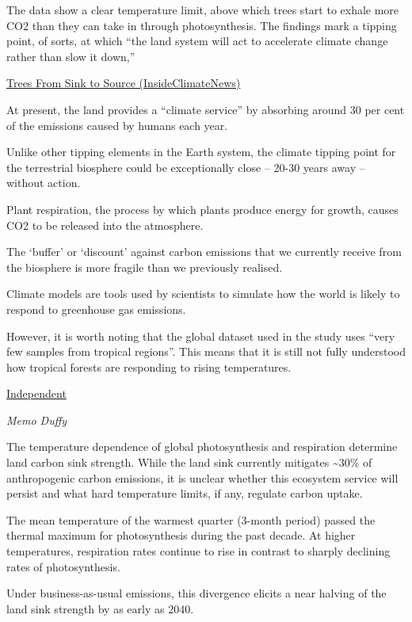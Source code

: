 \documentclass[
]{book}
\begin{document}
The data show a clear temperature limit,
above which trees start to exhale more CO2 than they can take in through photosynthesis.
The findings mark a tipping point, of sorts, at which ``the land system will act to accelerate climate change rather than slow it down,''

\href{https://insideclimatenews.org/news/13012021/forests-heat-climate-change/}{Trees From Sink to Source (InsideClimateNews)}

At present, the land provides a ``climate service'' by absorbing
around 30 per cent of the emissions caused by humans each year.

Unlike other tipping elements in the Earth system, the climate tipping point
for the terrestrial biosphere could be exceptionally close --
20-30 years away -- without action.

Plant respiration, the process by which plants produce energy for growth,
causes CO2 to be released into the atmosphere.

The `buffer' or `discount' against carbon emissions that we currently receive from the biosphere is more fragile than we previously realised.

Climate models are tools used by scientists to simulate how the world is likely to respond to greenhouse gas emissions.

However, it is worth noting that the global dataset used in the study
uses ``very few samples from tropical regions''.
This means that it is still not fully understood how tropical forests
are responding to rising temperatures.

\href{https://www.independent.co.uk/environment/climate-change/land-ecosystems-tipping-point-temperature-b1786822.html}{Independent}

\emph{Memo Duffy}

The temperature dependence of global photosynthesis and respiration
determine land carbon sink strength.
While the land sink currently mitigates \textasciitilde30\% of anthropogenic carbon emissions,
it is unclear whether this ecosystem service will persist and
what hard temperature limits, if any, regulate carbon uptake.

The mean temperature of the warmest quarter (3-month period)
passed the thermal maximum for photosynthesis during the past decade.
At higher temperatures, respiration rates continue to rise
in contrast to sharply declining rates of photosynthesis.

Under business-as-usual emissions, this divergence elicits a
near halving of the land sink strength by as early as 2040.
\end{document}
